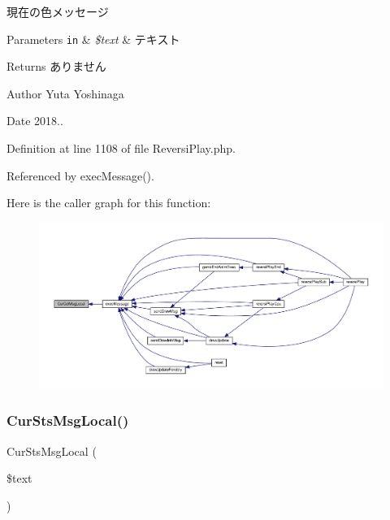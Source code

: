 現在の色メッセージ 


\begin{DoxyParams}[1]{Parameters}
\mbox{\tt in}  & {\em \$text} & テキスト \\
\hline
\end{DoxyParams}
\begin{DoxyReturn}{Returns}
ありません 
\end{DoxyReturn}
\begin{DoxyAuthor}{Author}
Yuta Yoshinaga 
\end{DoxyAuthor}
\begin{DoxyDate}{Date}
2018.. 
\end{DoxyDate}


Definition at line 1108 of file Reversi\+Play.\+php.



Referenced by exec\+Message().

Here is the caller graph for this function\+:
\nopagebreak
\begin{figure}[H]
\begin{center}
\leavevmode
\includegraphics[width=350pt]{class_reversi_play_aa217a221907e90c97719f8332c60a6d6_icgraph}
\end{center}
\end{figure}
\mbox{\label{class_reversi_play_ae3da8fb1a3a365c6e5254e5cf6f1e7bc}} 
\subsubsection{\texorpdfstring{Cur\+Sts\+Msg\+Local()}{CurStsMsgLocal()}}
{\footnotesize\ttfamily Cur\+Sts\+Msg\+Local (\begin{DoxyParamCaption}\item[{}]{\$text }\end{DoxyParamCaption})\hspace{0.3cm}{\ttfamily [private]}}




